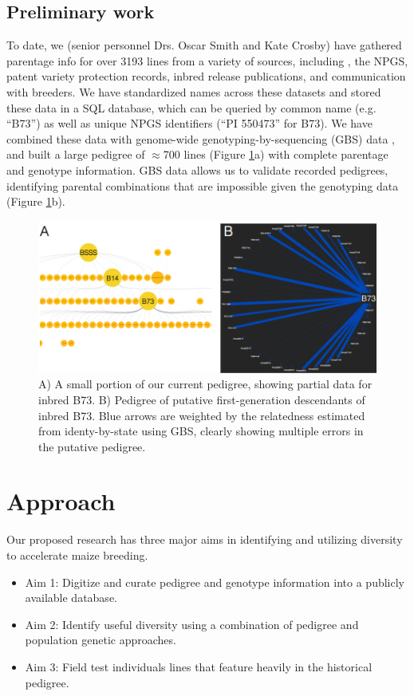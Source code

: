 \documentclass[12pt]{article}
\begin{document}
\subsection*{Preliminary work}
To date, we (senior personnel Drs. Oscar Smith and Kate Crosby) have gathered parentage info for over 3193 lines from a variety of sources, including \cite{gerdes1993compilation}, the NPGS, patent variety protection records, inbred release publications, and communication with breeders.
We have standardized names across these datasets and stored these data in a SQL database, which can be queried by common name (e.g. ``B73'') as well as unique NPGS identifiers (``PI 550473'' for B73).
We have combined these data with genome-wide genotyping-by-sequencing (GBS) data \citep{romay2013comprehensive}, and built a large pedigree of $\approx$700 lines (Figure \ref{fig:combo}a) with complete parentage and genotype information. GBS data allows us to validate recorded pedigrees, identifying parental combinations that are impossible given the genotyping data (Figure \ref{fig:combo}b).

\begin{figure}
\includegraphics[width=1\linewidth]{crosby_combo}
\caption{A) A small portion of our current pedigree, showing partial data for inbred  B73. B) Pedigree of putative first-generation descendants of inbred B73. Blue arrows are weighted by the relatedness estimated from identy-by-state using GBS, clearly showing multiple errors in the putative pedigree.}
\label{fig:combo}
\end{figure}

\section*{Approach}
\label{sec:approach}
Our proposed research has three major aims in identifying and utilizing diversity to accelerate maize breeding.

\begin{itemize}
\item Aim 1: Digitize and curate pedigree and genotype information into a publicly available database. 
\item Aim 2: Identify useful diversity using a combination of pedigree and population genetic approaches.
\item Aim 3: Field test individuals lines that feature heavily in the historical pedigree.
\end{itemize}
\end{document}
